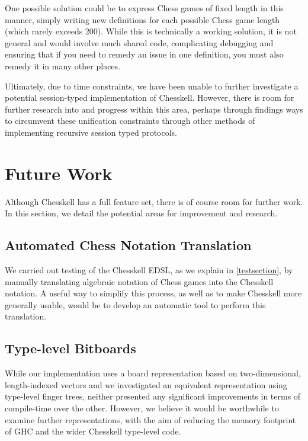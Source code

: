 One possible solution could be to express Chess games of fixed length in this manner, simply writing new definitions for each possible Chess game length (which rarely exceeds 200). While this is technically a working solution, it is not general and would involve much shared code, complicating debugging and ensuring that if you need to remedy an issue in one definition, you must also remedy it in many other places.

Ultimately, due to time constraints, we have been unable to further investigate a potential session-typed implementation of Chesskell. However, there is room for further research into and progress within this area, perhaps through findings ways to circumvent these unification constraints through other methods of implementing recursive session typed protocols.

\section{Future Work}

Although Chesskell has a full feature set, there is of course room for further work. In this section, we detail the potential areas for improvement and research.

\subsection{Automated Chess Notation Translation}

We carried out testing of the Chesskell EDSL, as we explain in \cref{testsection}, by manually translating algebraic notation of Chess games into the Chesskell notation. A useful way to simplify this process, as well as to make Chesskell more generally usable, would be to develop an automatic tool to perform this translation.


\subsection{Type-level Bitboards} \label{bitboardconclusion}

While our implementation uses a board representation based on two-dimensional, length-indexed vectors and we investigated an equivalent representation using type-level finger trees, neither presented any significant improvements in terms of compile-time over the other. However, we believe it would be worthwhile to examine further representations, with the aim of reducing the memory footprint of GHC and the wider Chesskell type-level code.

